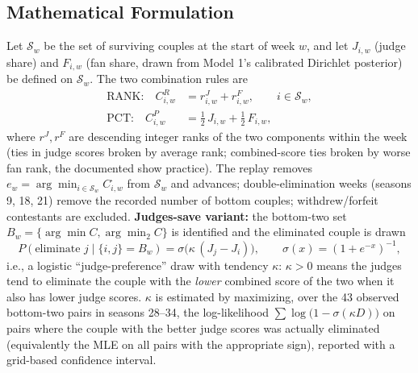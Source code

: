 \documentclass[11pt]{article}
\begin{document}
\subsection{Mathematical Formulation}

Let $\mathcal{S}_w$ be the set of surviving couples at the start of week $w$, and let
$J_{i,w}$ (judge share) and $F_{i,w}$ (fan share, drawn from Model 1's calibrated
Dirichlet posterior) be defined on $\mathcal{S}_w$. The two combination rules are
\begin{align}
  \text{RANK:}\quad C^{R}_{i,w} &= r^{J}_{i,w} + r^{F}_{i,w}, \qquad i \in \mathcal{S}_w,
  \label{eq:rankrule}\\
  \text{PCT:}\quad C^{P}_{i,w} &= \tfrac{1}{2}\,J_{i,w} + \tfrac{1}{2}\,F_{i,w},
  \label{eq:pctrule}
\end{align}
where $r^{J}, r^{F}$ are descending integer ranks of the two components within the week
(ties in judge scores broken by average rank; combined-score ties broken by worse fan
rank, the documented show practice). The replay removes
$e_w = \arg\min_{i \in \mathcal{S}_w} C^{\cdot}_{i,w}$ from $\mathcal{S}_w$ and advances;
double-elimination weeks (seasons 9, 18, 21) remove the recorded number of bottom
couples; withdrew/forfeit contestants are excluded. \textbf{Judges-save variant:} the
bottom-two set $B_w = \{\arg\min C, \arg\min_2 C\}$ is identified and the eliminated
couple is drawn
\begin{equation}
  P(\text{eliminate } j \mid \{i,j\} = B_w) = \sigma\bigl(\kappa\,(J_j - J_i)\bigr),
  \qquad \sigma(x) = (1+e^{-x})^{-1},
  \label{eq:save}
\end{equation}
i.e., a logistic ``judge-preference'' draw with tendency $\kappa$: $\kappa > 0$ means
the judges tend to eliminate the couple with the \emph{lower} combined score of the two
when it also has lower judge scores. $\kappa$ is estimated by maximizing, over the 43
observed bottom-two pairs in seasons 28--34, the log-likelihood
$\sum \log\bigl(1 - \sigma(\kappa D)\bigr)$ on pairs where the couple with the better
judge scores was actually eliminated (equivalently the MLE on all pairs with the
appropriate sign), reported with a grid-based confidence interval.
\end{document}
